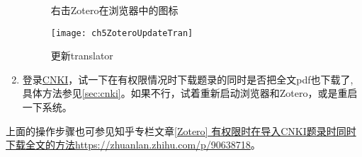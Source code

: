 \documentclass[cn,11pt,chinese]{elegantbook}
\begin{document}
\begin{enumerate}
\begin{figure}[htbp]
				  	\caption{右击Zotero在浏览器中的图标}
				  	\label{fig:ch5ZoteroOption}
				  \end{figure}
			     \begin{figure}[htbp]
			  	  \centering
			  	  \texttt{[image: ch5ZoteroUpdateTran]}
			  	  \caption{更新translator}
			  	  \label{fig:ch5ZoteroUpdateTran}
			     \end{figure}
		  \item
		  登录\href{http://www.cnki.net}{CNKI}，试一下在有权限情况时下载题录的同时是否把全文pdf也下载了,
		  具体方法参见\cref{sec:cnki}。如果不行，试着重新启动浏览器和Zotero，或是重启一下系统。
		   \end{enumerate}
	   
	   上面的操作步骤也可参见知乎专栏文章\href{https://zhuanlan.zhihu.com/p/90638718}{[Zotero]
	   有权限时在导入CNKI题录时同时下载全文的方法\url{https://zhuanlan.zhihu.com/p/90638718}}。
	
\end{document}
